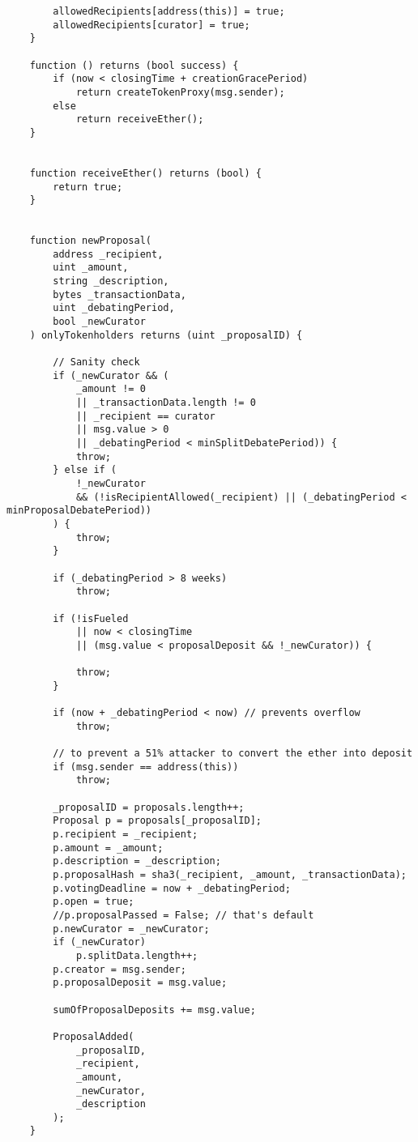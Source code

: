\documentclass[9pt,oneside]{amsart}
\begin{document}
\begin{appendix}
\begin{verbatim}
        allowedRecipients[address(this)] = true;
        allowedRecipients[curator] = true;
    }

    function () returns (bool success) {
        if (now < closingTime + creationGracePeriod)
            return createTokenProxy(msg.sender);
        else
            return receiveEther();
    }


    function receiveEther() returns (bool) {
        return true;
    }


    function newProposal(
        address _recipient,
        uint _amount,
        string _description,
        bytes _transactionData,
        uint _debatingPeriod,
        bool _newCurator
    ) onlyTokenholders returns (uint _proposalID) {

        // Sanity check
        if (_newCurator && (
            _amount != 0
            || _transactionData.length != 0
            || _recipient == curator
            || msg.value > 0
            || _debatingPeriod < minSplitDebatePeriod)) {
            throw;
        } else if (
            !_newCurator
            && (!isRecipientAllowed(_recipient) || (_debatingPeriod <  minProposalDebatePeriod))
        ) {
            throw;
        }

        if (_debatingPeriod > 8 weeks)
            throw;

        if (!isFueled
            || now < closingTime
            || (msg.value < proposalDeposit && !_newCurator)) {

            throw;
        }

        if (now + _debatingPeriod < now) // prevents overflow
            throw;

        // to prevent a 51% attacker to convert the ether into deposit
        if (msg.sender == address(this))
            throw;

        _proposalID = proposals.length++;
        Proposal p = proposals[_proposalID];
        p.recipient = _recipient;
        p.amount = _amount;
        p.description = _description;
        p.proposalHash = sha3(_recipient, _amount, _transactionData);
        p.votingDeadline = now + _debatingPeriod;
        p.open = true;
        //p.proposalPassed = False; // that's default
        p.newCurator = _newCurator;
        if (_newCurator)
            p.splitData.length++;
        p.creator = msg.sender;
        p.proposalDeposit = msg.value;

        sumOfProposalDeposits += msg.value;

        ProposalAdded(
            _proposalID,
            _recipient,
            _amount,
            _newCurator,
            _description
        );
    }



\end{verbatim}
\end{appendix}
\end{document}
